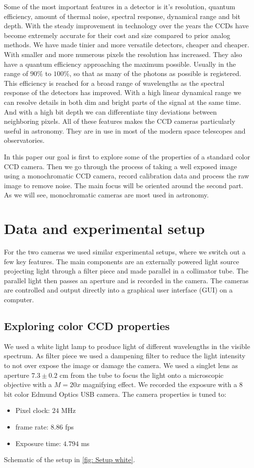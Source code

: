 \documentclass{emulateapj}
\begin{document}
Some of the most important features in a detector is it's resolution, quantum efficiency, amount of thermal noise, spectral response, dynamical range and bit depth. With the steady improvement in technology over the years the CCDs have become extremely accurate for their cost and size compared to prior analog methods. We have made tinier and more versatile detectors, cheaper and cheaper. With smaller and more numerous pixels the resolution has increased. They also have a quantum efficiency approaching the maximum possible. Usually in the range of $90\%$ to $100\%$, so that as many of the photons as possible is registered. This efficiency is reached for a broad range of wavelengths as the spectral response of the detectors has improved. With a high linear dynamical range we can resolve details in both dim and bright parts of the signal at the same time. And with a high bit depth we can differentiate tiny deviations between neighboring pixels. All of these features makes the CCD cameras particularly useful in astronomy. They are in use in most of the modern space telescopes and observatories. 

In this paper our goal is first to explore some of the properties of a standard color CCD camera. Then we go through the process of taking a well exposed image using a monochromatic CCD camera, record calibration data and process the raw image to remove noise. The main focus will be oriented around the second part. As we will see, monochromatic cameras are most used in astronomy.

\section{Data and experimental setup}
\label{sec:data}
For the two cameras we used similar experimental setups, where we switch out a few key features. The main components are an externally powered light source projecting light through a filter piece and made parallel in a collimator tube. The parallel light then passes an aperture and is recorded in the camera. The cameras are controlled and output directly into a graphical user interface (GUI) on a computer.
\subsection{Exploring color CCD properties}
\label{subsec: Data/color CCD}
We used a white light lamp to produce light of different wavelengths in the visible spectrum. As filter piece we used a dampening filter to reduce the light intensity to not over expose the image or damage the camera. We used a singlet lens as aperture $7.3 \pm 0.2$ cm from the tube to focus the light onto a microscopic objective with a $M=20x$ magnifying effect. We recorded the exposure with a 8 bit color Edmund Optics USB camera. The camera properties is tuned to:
\begin{itemize}
\item Pixel clock: $24$ MHz
\item frame rate: $8.86$ fps
\item Exposure time: $4.794$ ms
\end{itemize}
Schematic of the setup in \cref{fig: Setup white}.
\end{document}

